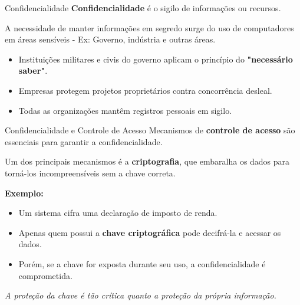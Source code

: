 \begin{frame}{Confidencialidade}
  \textbf{Confidencialidade} é o sigilo de informações ou recursos.

  \vspace{0.4cm}
  A necessidade de manter informações em segredo surge do uso de computadores em áreas sensíveis - Ex: Governo, indústria e outras áreas.

  \vspace{0.4cm}
  \begin{itemize}
    \item Instituições militares e civis do governo aplicam o princípio do \textbf{"necessário saber"}.
    \item Empresas protegem projetos proprietários contra concorrência desleal.
    \item Todas as organizações mantêm registros pessoais em sigilo.
  \end{itemize}
\end{frame}

\begin{frame}{Confidencialidade e Controle de Acesso}
  Mecanismos de \textbf{controle de acesso} são essenciais para garantir a confidencialidade.

  \vspace{0.3cm}
  Um dos principais mecanismos é a \textbf{criptografia}, que embaralha os dados para torná-los incompreensíveis sem a chave correta.

  \vspace{0.3cm}
  \textbf{Exemplo:}
  \begin{itemize}
    \item Um sistema cifra uma declaração de imposto de renda.
    \item Apenas quem possui a \textbf{chave criptográfica} pode decifrá-la e acessar os dados.
    \item Porém, se a chave for exposta durante seu uso, a confidencialidade é comprometida.
  \end{itemize}

  \vspace{0.2cm}
  \textit{A proteção da chave é tão crítica quanto a proteção da própria informação.}
\end{frame}

